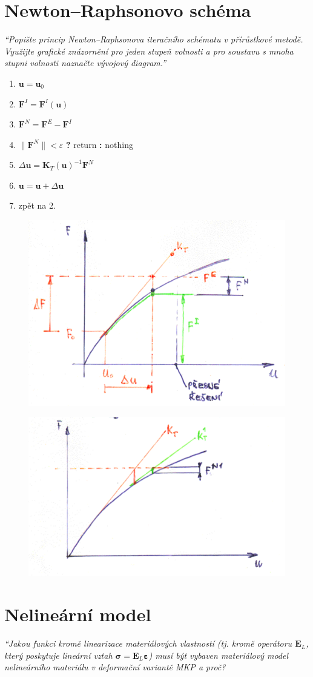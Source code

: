 \documentclass{article}
\begin{document}
	\section{Newton–Raphsonovo schéma}
	\emph{``Popište princip Newton–Raphsonova iteračního schématu v přírůstkové metodě. Využijte grafické znázornění pro jeden stupeň volnosti a pro soustavu s mnoha stupni volnosti naznačte vývojový diagram.''}
	\begin{enumerate}
		\item $\bm{u} = \bm{u}_0$
		\item $\bm{F}^I = \bm{F}^I(\bm{u})$
		\item $\bm{F}^N = \bm{F}^E - \bm{F}^I$
		\item $\|\bm{F}^N\| < \varepsilon$ \textbf{?} return \textbf{:} nothing
		\item $\Delta \bm{u} = \bm{K}_T(\bm{u})^{-1} \bm{F}^N$
		\item $\bm{u} = \bm{u} + \Delta \bm{u}$
		\item zpět na 2.
	\end{enumerate}
	\begin{figure}[h!]
		\centering
		\includegraphics[width=.5\linewidth]{figs/NR1.png}
	\end{figure}
	\begin{figure}[h!]
		\centering
		\includegraphics[width=.5\linewidth]{figs/NR2.png}
	\end{figure}

	\section{Nelineární model}
	\emph{``Jakou funkci kromě linearizace materiálových vlastností (tj. kromě operátoru $\bm{E}_L$, který poskytuje lineární vztah $\bm{\sigma} = \bm{E}_L \bm{\varepsilon}$) musí být vybaven materiálový model nelineárního materiálu v deformační variantě MKP a proč?}
\end{document}
